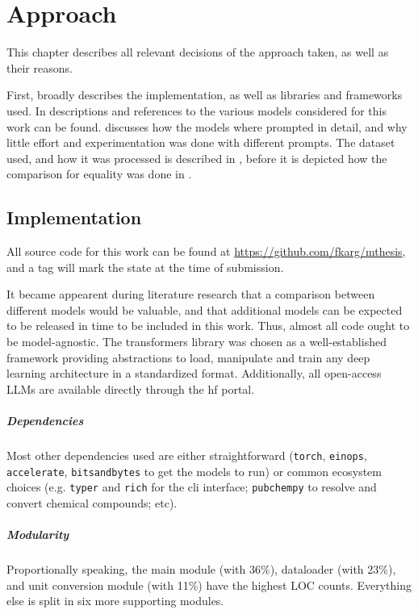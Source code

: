 \chapter{Approach}\label{chap:approach}
This chapter describes all relevant decisions of the approach taken, as well as their reasons.

First,  broadly describes the implementation, as well as libraries and frameworks used.
In  descriptions and references to the various models considered for this work can be found.
 discusses how the models where prompted in detail, and why little effort and experimentation was done with different prompts.
The dataset used, and how it was processed is described in , before it is depicted how the comparison for equality was done in .


\section{Implementation}\label{sec:impl}
All source code for this work can be found at \url{https://github.com/fkarg/mthesis}, and a tag will mark the state at the time of submission.

It became appearent during literature research that a comparison between different models would be valuable, and that additional models can be expected to be released in time to be included in this work.
Thus, almost all code ought to be model-agnostic.
The \acrlong{transformers} library was chosen as a well-established framework providing abstractions to load, manipulate and train any deep learning architecture in a standardized format.
Additionally, all open-access \glspl{LLM} are available directly through the \gls{hf} portal.

\paragraph{Dependencies}
Most other dependencies used are either straightforward (\texttt{torch}, \texttt{einops}, \texttt{accelerate}, \texttt{bitsandbytes} to get the models to run) or common ecosystem choices (e.g. \texttt{typer} and \texttt{rich} for the cli interface; \texttt{pubchempy} to resolve and convert chemical compounds; etc).

\paragraph{Modularity}
Proportionally speaking, the main module (with 36\%), dataloader (with 23\%), and unit conversion module (with 11\%) have the highest \gls{LOC} counts. Everything else is split in six more supporting modules.


